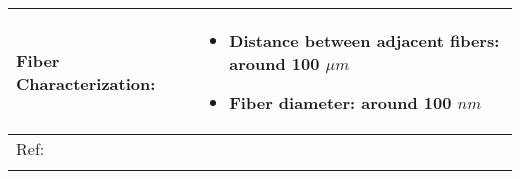 \begin{table}[th]
\begin{center}
\begin{tabular}{
>{\raggedright\arraybackslash}p{}
>{\raggedright\arraybackslash}p{} }
\hline
Fiber Characterization: &
\begin{itemize}[leftmargin=*]
\item Distance between adjacent fibers: around 100 $\mu m$
\item Fiber diameter: around 100 $n m$
\end{itemize} \\

\hline
Ref: & \cite{Camillo2013} \\ %
\arrayrulecolor{black}\hline
\label{tbl:FloresCompare}
\end{tabular}
\end{center}
\end{table}

